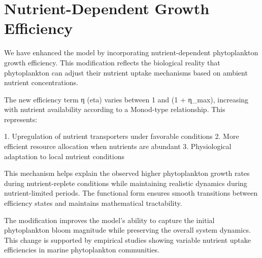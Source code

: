 \section{Nutrient-Dependent Growth Efficiency}

We have enhanced the model by incorporating nutrient-dependent phytoplankton growth efficiency. This modification reflects the biological reality that phytoplankton can adjust their nutrient uptake mechanisms based on ambient nutrient concentrations.

The new efficiency term η (eta) varies between 1 and (1 + η_max), increasing with nutrient availability according to a Monod-type relationship. This represents:

1. Upregulation of nutrient transporters under favorable conditions
2. More efficient resource allocation when nutrients are abundant
3. Physiological adaptation to local nutrient conditions

This mechanism helps explain the observed higher phytoplankton growth rates during nutrient-replete conditions while maintaining realistic dynamics during nutrient-limited periods. The functional form ensures smooth transitions between efficiency states and maintains mathematical tractability.

The modification improves the model's ability to capture the initial phytoplankton bloom magnitude while preserving the overall system dynamics. This change is supported by empirical studies showing variable nutrient uptake efficiencies in marine phytoplankton communities.
